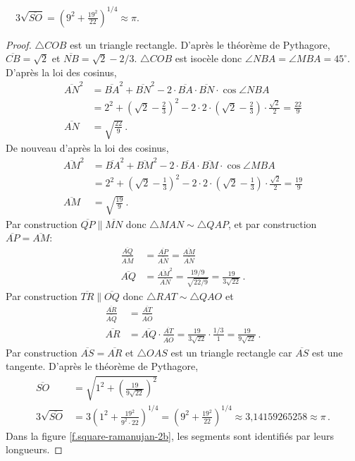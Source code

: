 \begin{theorem}\label{thm.ramanujan2}
$\quad 3\sqrt{\overline{SO}}=\left(9^2+\displaystyle\frac{19^2}{22}\right)^{1/4}\approx \pi$.
\end{theorem}
\begin{proof}
$\triangle COB$ est un triangle rectangle. D'après le théorème de Pythagore,  $\overline{CB}=\sqrt{2}$ et 
$\overline{NB}=\sqrt{2}-2/3$. 
$\triangle COB$ est isocèle donc 
 $\angle NBA =\angle MBA=45^\circ$. D'après la loi des cosinus,
\begin{align*}
\overline{AN}^2&=\overline{BA}^2 + \overline{BN}^2-2\cdot\overline{BA}\cdot\overline{BN}\cdot\cos \angle NBA\\
&=2^2+\left(\sqrt{2}-\frac{2}{3}\right)^2-2\cdot 2 \cdot \left(\sqrt{2}-\frac{2}{3}\right)\cdot \frac{\sqrt{2}}{2}
=\frac{22}{9}\\
\overline{AN}&=\sqrt{\frac{22}{9}}\,.
\end{align*}
De nouveau d'après la loi des cosinus,
\begin{align*}
\overline{AM}^2&=\overline{BA}^2 + \overline{BM}^2-2\cdot\overline{BA}\cdot\overline{BM}\cdot\cos \angle MBA\\
&=2^2+\left(\sqrt{2}-\frac{1}{3}\right)^2-2\cdot 2 \cdot \left(\sqrt{2}-\frac{1}{3}\right)\cdot \frac{\sqrt{2}}{2}
=\frac{19}{9}\\
\overline{AM}&=\sqrt{\frac{19}{9}}\,.
\end{align*}
Par construction $\overline{QP}\parallel  \overline{MN}$ donc 
$\triangle MAN\sim \triangle QAP$, et par  construction $\overline{AP}=\overline{AM}$:
\begin{align*}
\frac{\overline{AQ}}{\overline{AM}}&=\frac{\overline{AP}}{\overline{AN}}=\frac{\overline{AM}}{\overline{AN}}\\
\overline{AQ}&=\frac{\overline{AM}^2}{\overline{AN}}=\frac{19/9}{\sqrt{22/9}}=\frac{19}{3\sqrt{22}}\,.
\end{align*}
Par construction $\overline{TR}\parallel  \overline{OQ}$ donc 
$\triangle RAT\sim \triangle QAO$  et 
\begin{align*}
\frac{\overline{AR}}{\overline{AQ}}&=\frac{\overline{AT}}{\overline{AO}}\\
\overline{AR}&=\overline{AQ}\cdot\frac{\overline{AT}}{\overline{AO}}=\frac{19}{3\sqrt{22}}\cdot\frac{1/3}{1}=\frac{19}{9\sqrt{22}}\,.
\end{align*}
Par construction $\overline{AS}=\overline{AR}$ et $\triangle OAS$ est un triangle rectangle car $\overline{AS}$ est une tangente. D'après le théorème de Pythagore,
\begin{align*}
\overline{SO}&=\sqrt{1^2+\left(\frac{19}{9\sqrt{22}}\right)^2}\\
3\sqrt{\overline{SO}}&=3\left(1^2+\frac{19^2}{9^2\cdot 22}\right)^{1/4}=
\left(9^2+\frac{19^2}{22}\right)^{1/4}\approx \mbox{3,14159265258}\approx\pi\,.
\end{align*}
\enlargethispage{\baselineskip}
Dans la figure \ref{f.square-ramanujan-2b}, les segments sont identifiés par leurs longueurs.
\end{proof}


